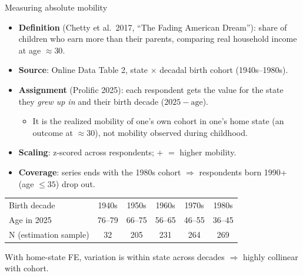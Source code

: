 \documentclass[aspectratio=169]{beamer}
\begin{document}
\begin{frame}{Measuring absolute mobility}
\footnotesize
\begin{itemize}
    \item \textbf{Definition} (Chetty et al.\ 2017, ``The Fading American Dream''): share of children who earn more than their parents, comparing real household income at age $\approx 30$.
    \item \textbf{Source}: Online Data Table 2, state $\times$ decadal birth cohort (1940s--1980s).
    \item \textbf{Assignment} (Prolific 2025): each respondent gets the value for the state they \emph{grew up in} and their birth decade ($2025 - \text{age}$).
    \begin{itemize}\footnotesize
        \item It is the realized mobility of one's own cohort in one's home state (an outcome at $\approx 30$), not mobility observed during childhood.
    \end{itemize}
    \item \textbf{Scaling}: z-scored across respondents; $+$ $=$ higher mobility.
    \item \textbf{Coverage}: series ends with the 1980s cohort $\Rightarrow$ respondents born 1990+ (age $\le 35$) drop out.
\end{itemize}

\vspace{-0.3em}
\begin{center}
{\scriptsize\setlength{\tabcolsep}{6pt}
\begin{tabular}{lccccc}
\toprule
Birth decade & 1940s & 1950s & 1960s & 1970s & 1980s \\
Age in 2025 & 76--79 & 66--75 & 56--65 & 46--55 & 36--45 \\
N (estimation sample) & 32 & 205 & 231 & 264 & 269 \\
\bottomrule
\end{tabular}}
\end{center}
\vspace{-0.4em}
{\scriptsize\centering With home-state FE, variation is within state across decades $\Rightarrow$ highly collinear with cohort.\par}

\end{frame}
\end{document}
